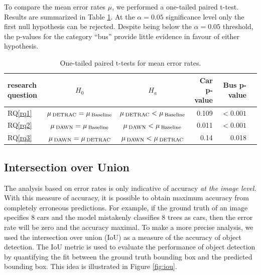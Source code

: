 \documentclass[]{article}
\begin{document}
	
	To compare the mean error rates $\mu$, we performed a one-tailed paired t-test. Results are summarized in Table \ref{table:t-test}.	At the $\alpha=0.05$ significance level only the first null hypothesis can be rejected. Despite being below the $\alpha=0.05$ threshold, the p-values for the category ``bus'' provide little evidence in favour of either hypothesis.
	
	
	\begin{table}[H]
		\centering
		\begin{tabular}{lccrrp{1.5in}}
			\toprule
			research question & \textbf{$H_0$} & \textbf{$H_a$} & Car p-value & Bus p-value \\
			\midrule
			RQ\ref{rq1} & $\mu\,\textsubscript{DETRAC} = \mu\,\textsubscript{Baseline}$ & $\mu\,\textsubscript{DETRAC} < \mu\,\textsubscript{Baseline}$ &  0.109 & $< 0.001$ \\
			RQ\ref{rq2} & $\mu\,\textsubscript{DAWN} = \mu\,\textsubscript{Baseline}$   & $\mu\,\textsubscript{DAWN} < \mu\,\textsubscript{Baseline}$   & 0.011 & $< 0.001$   \\
			RQ\ref{rq3} & $\mu\,\textsubscript{DAWN} = \mu\,\textsubscript{DETRAC}$ & $\mu\,\textsubscript{DAWN} < \mu\,\textsubscript{DETRAC}$ &  0.14  & 0.018 \\
			\bottomrule
		\end{tabular}
		\caption{One-tailed paired t-tests for mean error rates.}
		\label{table:t-test}
	\end{table}
	 
\subsection{Intersection over Union}  
	
	The analysis based on error rates is only indicative of accuracy \emph{at the image level}. With this measure of accuracy, it is possible to obtain maximum accuracy from completely erroneous predictions. For example, if the ground truth of an image specifies 8 cars and the model mistakenly classifies 8 trees as cars, then the error rate will be zero and the accuracy maximal. To make a more precise analysis, we used the intersection over union (IoU) as a measure of the accuracy of object detection. The IoU metric is used to evaluate the performance of object detection by quantifying the fit between the ground truth bounding box and the predicted bounding box. This idea is illustrated in Figure \ref{fig:iou}.
	
\end{document}
